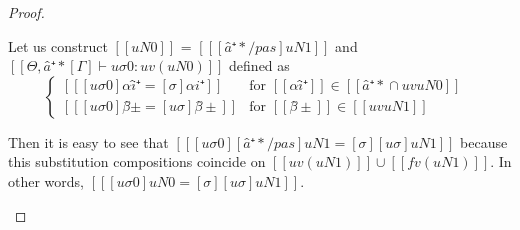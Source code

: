 \begin{proof}
\begin{caseof}
\begin{enumerate}
\begin{enumerate}
                            Let us construct $[[uN0]]$ = $[[ [â⁺*/pas]uN1 ]]$
                            and $[[Θ, â⁺*[Γ] ⊢ uσ0 : uv(uN0)]]$ defined as
                            $$
                            \begin{cases}
                                [[ [uσ0]αî⁺ = [σ]αi⁺ ]] & \text{for $[[αî⁺]] \in  [[{â⁺*} ∩ uv uN0]]$ }\\
                                [[ [uσ0]β̂± = [uσ]β̂± ]] & \text{for $[[β̂±]] \in [[uv uN1]]$}
                            \end{cases}
                            $$

                            Then it is easy to see that $[[ [uσ0][â⁺*/pas]uN1 = [σ][uσ]uN1 ]]$
                            because this substitution compositions coincide on
                            $[[uv(uN1)]] \cup [[fv(uN1)]]$. 
                            In other words, $[[ [uσ0]uN0 = [σ][uσ]uN1 ]]$.


\end{enumerate}
\end{enumerate}
\end{caseof}
\end{proof}
